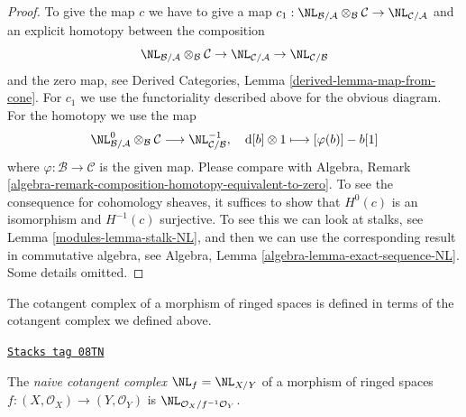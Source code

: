 \begin{proof}

To give the map $c$ we have to give a map
$c_1 : \NL_{\mathcal{B}/\mathcal{A}} \otimes_\mathcal{B} \mathcal{C}
\to \NL_{\mathcal{C}/\mathcal{A}}$ and an explicit homotopy
between the composition
$$
\NL_{\mathcal{B}/\mathcal{A}} \otimes_\mathcal{B} \mathcal{C} \to
\NL_{\mathcal{C}/\mathcal{A}} \to \NL_{\mathcal{C}/\mathcal{B}}
$$
and the zero map, see
Derived Categories, Lemma \ref{derived-lemma-map-from-cone}.
For $c_1$ we use the functoriality described
above for the obvious diagram. For the homotopy we use the map
$$
\NL_{\mathcal{B}/\mathcal{A}}^0 \otimes_\mathcal{B} \mathcal{C}
\longrightarrow
\NL_{\mathcal{C}/\mathcal{B}}^{-1},\quad
\text{d}[b] \otimes 1 \longmapsto [\varphi(b)] - b[1]
$$
where $\varphi : \mathcal{B} \to \mathcal{C}$ is the given map.
Please compare with
Algebra, Remark \ref{algebra-remark-composition-homotopy-equivalent-to-zero}.
To see the consequence for cohomology sheaves, it suffices to show
that $H^0(c)$ is an isomorphism and $H^{-1}(c)$ surjective.
To see this we can look at stalks, see Lemma \ref{modules-lemma-stalk-NL},
and then we can use the corresponding result in commutative algebra,
see Algebra, Lemma \ref{algebra-lemma-exact-sequence-NL}.
Some details omitted.
\end{proof}

The cotangent complex of a morphism of ringed spaces is defined
in terms of the cotangent complex we defined above.

\begin{definition}
\label{modules-definition-cotangent-complex-morphism-ringed-topoi}
\href{https://stacks.math.columbia.edu/tag/08TN}{\texttt{Stacks tag 08TN}}

The {\it naive cotangent complex} $\NL_f = \NL_{X/Y}$ of a morphism of ringed
spaces $f : (X, \mathcal{O}_X) \to (Y, \mathcal{O}_Y)$ is
$\NL_{\mathcal{O}_X/f^{-1}\mathcal{O}_Y}$.
\end{definition}

